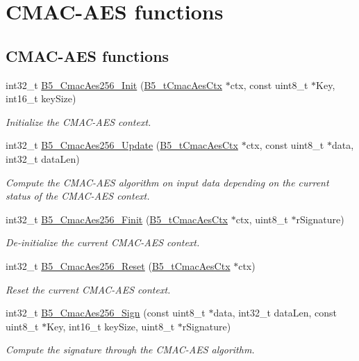 \hypertarget{group__cmacaes_func}{\section{C\-M\-A\-C-\/\-A\-E\-S functions}
\label{group__cmacaes_func}
}
\subsection*{C\-M\-A\-C-\/\-A\-E\-S functions}
\begin{DoxyCompactItemize}
\item 
int32\-\_\-t \hyperlink{group__cmacaes_func_gae6f89895e340f9aecab79db450e4a185}{B5\-\_\-\-Cmac\-Aes256\-\_\-\-Init} (\hyperlink{struct_b5__t_cmac_aes_ctx}{B5\-\_\-t\-Cmac\-Aes\-Ctx} $\ast$ctx, const uint8\-\_\-t $\ast$Key, int16\-\_\-t key\-Size)
\begin{DoxyCompactList}\small\item\em Initialize the C\-M\-A\-C-\/\-A\-E\-S context. \end{DoxyCompactList}\item 
int32\-\_\-t \hyperlink{group__cmacaes_func_ga4c80b95f59e134548b2a3c678df533f4}{B5\-\_\-\-Cmac\-Aes256\-\_\-\-Update} (\hyperlink{struct_b5__t_cmac_aes_ctx}{B5\-\_\-t\-Cmac\-Aes\-Ctx} $\ast$ctx, const uint8\-\_\-t $\ast$data, int32\-\_\-t data\-Len)
\begin{DoxyCompactList}\small\item\em Compute the C\-M\-A\-C-\/\-A\-E\-S algorithm on input data depending on the current status of the C\-M\-A\-C-\/\-A\-E\-S context. \end{DoxyCompactList}\item 
int32\-\_\-t \hyperlink{group__cmacaes_func_ga5507419d1c00777a9c3c942d13636178}{B5\-\_\-\-Cmac\-Aes256\-\_\-\-Finit} (\hyperlink{struct_b5__t_cmac_aes_ctx}{B5\-\_\-t\-Cmac\-Aes\-Ctx} $\ast$ctx, uint8\-\_\-t $\ast$r\-Signature)
\begin{DoxyCompactList}\small\item\em De-\/initialize the current C\-M\-A\-C-\/\-A\-E\-S context. \end{DoxyCompactList}\item 
int32\-\_\-t \hyperlink{group__cmacaes_func_gaa939a0bb0cf5bb09d83d1d08163b346e}{B5\-\_\-\-Cmac\-Aes256\-\_\-\-Reset} (\hyperlink{struct_b5__t_cmac_aes_ctx}{B5\-\_\-t\-Cmac\-Aes\-Ctx} $\ast$ctx)
\begin{DoxyCompactList}\small\item\em Reset the current C\-M\-A\-C-\/\-A\-E\-S context. \end{DoxyCompactList}\item 
int32\-\_\-t \hyperlink{group__cmacaes_func_ga4df2c9dc0b4f5d54ebc023fc791632ba}{B5\-\_\-\-Cmac\-Aes256\-\_\-\-Sign} (const uint8\-\_\-t $\ast$data, int32\-\_\-t data\-Len, const uint8\-\_\-t $\ast$Key, int16\-\_\-t key\-Size, uint8\-\_\-t $\ast$r\-Signature)
\begin{DoxyCompactList}\small\item\em Compute the signature through the C\-M\-A\-C-\/\-A\-E\-S algorithm. \end{DoxyCompactList}\end{DoxyCompactItemize}


